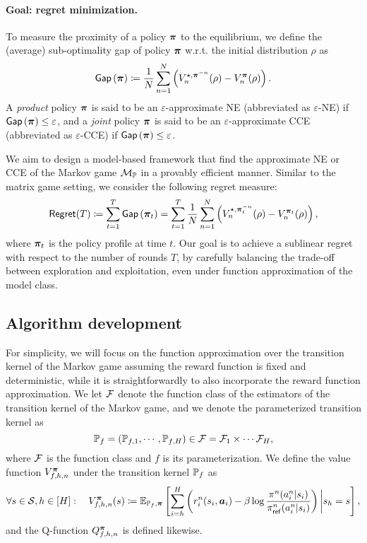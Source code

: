 
\paragraph{Goal: regret minimization.} 
To measure the proximity of a policy ${\bm{\pi}}$ to the equilibrium, we define the (average) sub-optimality gap of policy ${\bm{\pi}}$ w.r.t. the initial distribution $\rho$ as
\begin{align}\label{eq:gap}
    \mathsf{Gap}\left({\bm{\pi}}\right)\coloneqq \frac{1}{N}\sum_{n=1}^N \left(V_n^{\star,{\bm{\pi}}^{-n}}(\rho) - V_n^{{\bm{\pi}}}(\rho)\right).
\end{align}
A \textit{product} policy ${\bm{\pi}}$ is said to be an $\varepsilon$-approximate NE (abbreviated as $\varepsilon$-NE) if $\mathsf{Gap}\left({\bm{\pi}}\right)\leq \varepsilon$, and a \textit{joint} policy ${\bm{\pi}}$ is said to be an $\varepsilon$-approximate CCE (abbreviated as $\varepsilon$-CCE) if $\mathsf{Gap}\left({\bm{\pi}}\right)\leq \varepsilon$.
 

%
We aim to design a model-based framework that find the approximate NE or CCE of the Markov game ${\mathcal{M}}_{\mathbb P}$ in a provably efficient manner. Similar to the matrix game setting, we consider the following regret measure:
\begin{align}\label{eq:regret_MG}
 \mathsf{Regret}(T)\coloneqq\sum_{t=1}^T\mathsf{Gap}\left({\bm{\pi}}_t\right)=\sum_{t=1}^T\frac{1}{N}\sum_{n=1}^N \left(V_n^{\star,{\bm{\pi}}_t^{-n}}(\rho) - V_n^{{\bm{\pi}}_t}(\rho)\right),
\end{align}
where ${\bm{\pi}}_t$ is the policy profile at time $t$. Our goal is to achieve a sublinear regret with respect to the number of rounds $T$, by carefully balancing the trade-off between exploration and exploitation, even under function approximation of the model class. 


\subsection{Algorithm development}\label{sec:markov_alg}

For simplicity, we will focus on the function approximation over the transition kernel of the Markov game assuming the reward function is fixed and deterministic, while it is straightforwardly to also incorporate the reward function approximation. We let ${\mathcal{F}}$ denote the function class of the estimators of the transition kernel of the Markov game, and we denote the parameterized transition kernel as
$${\mathbb P}_f=({\mathbb P}_{f,1},\cdots,{\mathbb P}_{f,H})\in{\mathcal{F}}={\mathcal{F}}_1\times\cdots{\mathcal{F}}_H,$$ 
where ${\mathcal{F}}$ is the function class and $f$ is its parameterization.  We define the value function $V_{f,h,n}^{{\bm{\pi}}}$ under the transition kernel ${\mathbb P}_f$ as
\begin{align}\label{eq:V_f}
    \forall s\in{\mathcal{S}}, h\in[H]:\quad V_{f,h,n}^{{\bm{\pi}}}(s)\coloneqq \mathbb{E}_{{\mathbb P}_f,{\bm{\pi}}}\left[\sum_{i=h}^H \left(r_i^n(s_i,{\bm{a}}_i)-\beta\log\frac{\pi^n(a_i^n|s_i)}{\pi_{\mathsf{ref}}^n(a_i^n|s_i)}\right)\bigg|s_h=s\right],
\end{align}
and the Q-function  $Q_{f,h,n}^{{\bm{\pi}}}$ is defined likewise.

